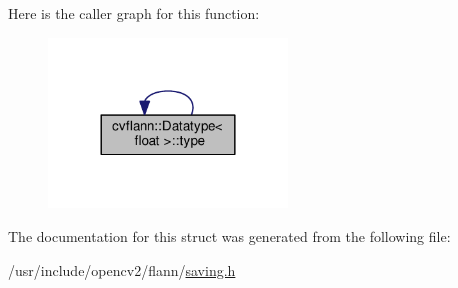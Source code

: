 Here is the caller graph for this function\-:\nopagebreak
\begin{figure}[H]
\begin{center}
\leavevmode
\includegraphics[width=180pt]{structcvflann_1_1Datatype_3_01float_01_4_ab3421883c05270530d78dc4b7dd07712_icgraph}
\end{center}
\end{figure}




The documentation for this struct was generated from the following file\-:\begin{DoxyCompactItemize}
\item 
/usr/include/opencv2/flann/\hyperlink{saving_8h}{saving.\-h}\end{DoxyCompactItemize}
